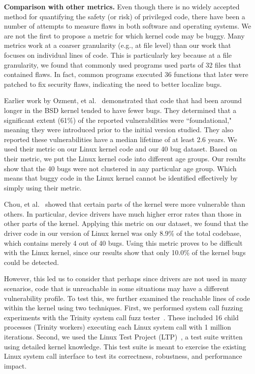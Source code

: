 \textbf{Comparison with other metrics.}
Even though there is no widely accepted method for
quantifying the safety (or risk) of privileged code, there have been a number of
attempts to measure flaws in both software and operating systems.
We are not the first to propose a metric for which kernel code may be buggy.
Many metrics work at a coarser granularity (e.g., at file level) than our work that focuses on
individual lines of code.  This is particularly key because at a file
granularity, we found that commonly used programs used parts of
32 files that contained flaws. In fact, common
programs executed 36 functions that later were patched to fix security
flaws, indicating the need to better localize bugs.

Earlier work by Ozment, et al.~\cite{ozment2006milk} demonstrated that code that
had been around longer in the BSD kernel tended to have fewer bugs.  
They determined that a significant extent (61\%) of the reported
vulnerabilities were ``foundational," meaning they were introduced prior to the
initial version studied. They also reported these vulnerabilities
have a median lifetime of at least 2.6 years. 
We used their metric on our Linux kernel code and our 40 bug dataset. 
Based on their metric, we put the Linux kernel code into different age groups.   
Our results show that the 40 bugs were not clustered in any particular age group. 
Which means that buggy code in the Linux kernel cannot be identified effectively 
by simply using their metric.  

Chou, et al.~\cite{PittSFIeld} showed that certain parts of the kernel
were more vulnerable than others. In particular, device drivers have
much higher error rates than those in other parts of the kernel. 
Applying this metric on our dataset, we found that the driver code in our version 
of Linux kernel was only 8.9\% of the total codebase, which contains merely 4 out of 40 bugs. 
Using this metric proves to be difficult with the Linux kernel, since our results show that 
only 10.0\% of the kernel bugs could be detected. 

However, this led us to consider that perhaps since drivers are not used
in many scenarios, code that is unreachable in some situations may have a
different vulnerability profile.  To test this, we
further examined the reachable lines of
code within the kernel using two techniques.  First,
we performed system call fuzzing experiments with the Trinity
system call fuzz tester~\cite{Trinity}. These included 16 child processes
(Trinity workers) executing each Linux system call with 1 million iterations.
Second, we used the Linux Test Project (LTP)~\cite{LTP}, a test suite written
using detailed kernel knowledge.  
This test suite is meant to exercise the existing Linux system call interface to 
test its correctness, robustness, and performance impact. 


